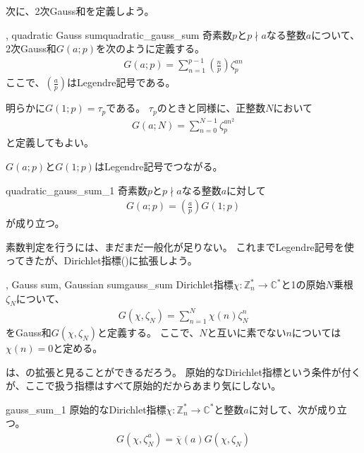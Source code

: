 次に、2次Gauss和を定義しよう。

\begin{Defi}{, quadratic Gauss sum}{quadratic_gauss_sum}
奇素数$p$と$p \nmid a$なる整数$a$について、2次Gauss和$G(a;p)$を次のように定義する。
\begin{align*}
G(a;p) = \sum_{n=1}^{p-1} \left(\frac{n}{p}\right) \zeta_p^{an}
\end{align*}
ここで、$\left(\frac{a}{p}\right)$はLegendre記号である。
\end{Defi}

明らかに$G(1; p)=\tau_p$である。
$\tau_p$のときと同様に、正整数$N$において
\begin{align*}
G(a; N) = \sum_{n=0}^{N-1} \zeta_p^{an^2}
\end{align*}
と定義してもよい。

$G(a;p)$と$G(1;p)$はLegendre記号でつながる。
\begin{Prop}{}{quadratic_gauss_sum_1}
奇素数$p$と$p \nmid a$なる整数$a$に対して
\begin{align*}
G(a; p) = \left(\frac{a}{p}\right) G(1;p)
\end{align*}
が成り立つ。
\end{Prop}

素数判定を行うには、まだまだ一般化が足りない。
これまでLegendre記号を使ってきたが、Dirichlet指標()に拡張しよう。

\begin{Defi}{, Gauss sum, Gaussian sum}{gauss_sum}
Dirichlet指標$\chi:\mathbb{Z}_n^*\to\mathbb{C}^*$と1の原始$N$乗根$\zeta_N$について、
\begin{align*}
G(\chi, \zeta_N) = \sum_{n=1}^{N} \chi(n) \zeta_N^{n}
\end{align*}
をGauss和$G(\chi, \zeta_N)$と定義する。
ここで、$N$と互いに素でない$n$については$\chi(n)=0$と定める。
\end{Defi}

は、の拡張と見ることができるだろう。
原始的なDirichlet指標という条件が付くが、ここで扱う指標はすべて原始的だからあまり気にしない。

\begin{Prop}{}{gauss_sum_1}
原始的なDirichlet指標$\chi:\mathbb{Z}_n^*\to\mathbb{C}^*$と整数$a$に対して、次が成り立つ。
\begin{align*}
G(\chi, \zeta_N^a) = \overline{\chi}(a)G(\chi, \zeta_N)
\end{align*}
\end{Prop}

